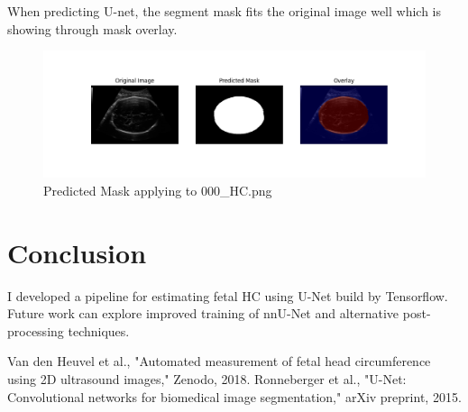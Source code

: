\documentclass[twocolumn]{article}
\begin{document}
When predicting U-net, the segment mask fits the original image well which is showing through mask overlay. 

\begin{figure}[H]
    \centering
    \includegraphics[width=1\linewidth]{figures/predicted_mask.png}
    \caption{Predicted Mask applying to 000\_HC.png}
    \label{fig:enter-label}
\end{figure}

\section{Conclusion}
I developed a pipeline for estimating fetal HC using U-Net build by Tensorflow. Future work can explore improved training of nnU-Net and alternative post-processing techniques.

\begin{thebibliography}{9}
 Van den Heuvel et al., "Automated measurement of fetal head circumference using 2D ultrasound images," Zenodo, 2018.
 Ronneberger et al., "U-Net: Convolutional networks for biomedical image segmentation," arXiv preprint, 2015.
\end{thebibliography}
\end{document}
